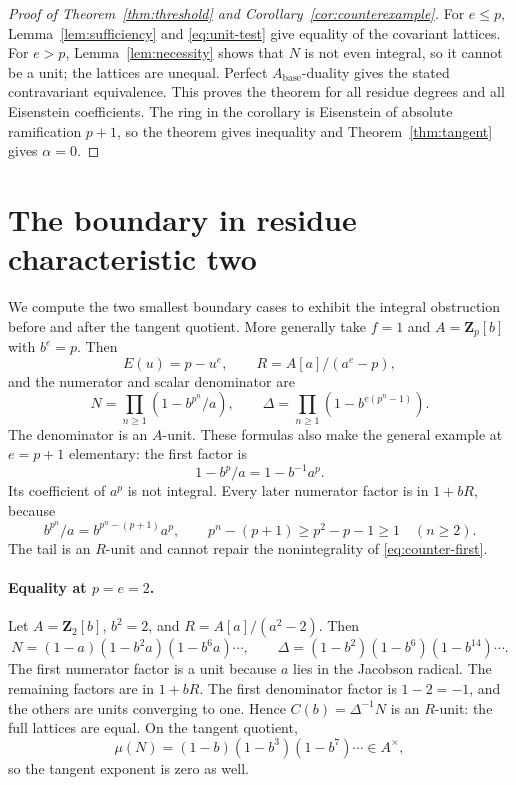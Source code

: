 \documentclass[11pt]{article}
\theoremstyle{definition}\newtheorem{definition}[theorem]{Definition}
\theoremstyle{remark}\newtheorem{remark}[theorem]{Remark}
\newcommand{\ZZ}{\mathbf Z}
\newcommand{\base}{\mathrm{base}}
\begin{document}
\begin{proof}[Proof of Theorem~\ref{thm:threshold} and Corollary~\ref{cor:counterexample}]
For $e\le p$, Lemma~\ref{lem:sufficiency} and \eqref{eq:unit-test} give equality of the covariant lattices. For $e>p$, Lemma~\ref{lem:necessity} shows that $N$ is not even integral, so it cannot be a unit; the lattices are unequal. Perfect $A_{\base}$-duality gives the stated contravariant equivalence. This proves the theorem for all residue degrees and all Eisenstein coefficients. The ring in the corollary is Eisenstein of absolute ramification $p+1$, so the theorem gives inequality and Theorem~\ref{thm:tangent} gives $\alpha=0$.
\end{proof}

\section{The boundary in residue characteristic two}\label{sec:examples}

We compute the two smallest boundary cases to exhibit the integral obstruction before and after the tangent quotient. More generally take $f=1$ and $A=\ZZ_p[b]$ with $b^e=p$. Then
\[
 E(u)=p-u^e,\qquad R=A[a]/(a^e-p),
\]
and the numerator and scalar denominator are
\begin{equation}\label{eq:pure-products}
 N=\prod_{n\ge1}(1-b^{p^n}/a),\qquad
 \Delta=\prod_{n\ge1}(1-b^{e(p^n-1)}).
\end{equation}
The denominator is an $A$-unit. These formulas also make the general example at $e=p+1$ elementary: the first factor is
\begin{equation}\label{eq:counter-first}
 1-b^p/a=1-b^{-1}a^p.
\end{equation}
Its coefficient of $a^p$ is not integral. Every later numerator factor is in $1+bR$, because
\[
 b^{p^n}/a=b^{p^n-(p+1)}a^p,
 \qquad p^n-(p+1)\ge p^2-p-1\ge1
 \quad(n\ge2).
\]
The tail is an $R$-unit and cannot repair the nonintegrality of \eqref{eq:counter-first}.

\paragraph{Equality at $p=e=2$.}
Let $A=\ZZ_2[b]$, $b^2=2$, and $R=A[a]/(a^2-2)$. Then
\[
 N=(1-a)(1-b^2a)(1-b^6a)\cdots,
 \qquad
 \Delta=(1-b^2)(1-b^6)(1-b^{14})\cdots.
\]
The first numerator factor is a unit because $a$ lies in the Jacobson radical. The remaining factors are in $1+bR$. The first denominator factor is $1-2=-1$, and the others are units converging to one. Hence $C(b)=\Delta^{-1}N$ is an $R$-unit: the full lattices are equal. On the tangent quotient,
\[
 \mu(N)=(1-b)(1-b^3)(1-b^7)\cdots\in A^\times,
\]
so the tangent exponent is zero as well.
\end{document}
